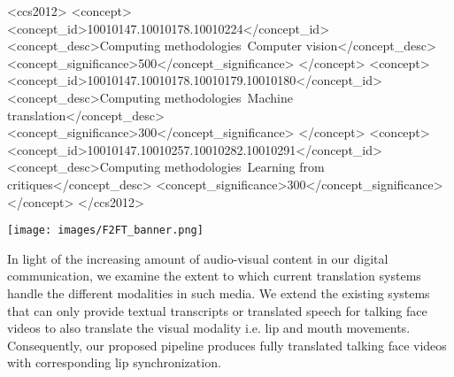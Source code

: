 \documentclass[sigconf]{acmart}
\begin{document}
\begin{CCSXML}
<ccs2012>
<concept>
<concept_id>10010147.10010178.10010224</concept_id>
<concept_desc>Computing methodologies~Computer vision</concept_desc>
<concept_significance>500</concept_significance>
</concept>
<concept>
<concept_id>10010147.10010178.10010179.10010180</concept_id>
<concept_desc>Computing methodologies~Machine translation</concept_desc>
<concept_significance>300</concept_significance>
</concept>
<concept>
<concept_id>10010147.10010257.10010282.10010291</concept_id>
<concept_desc>Computing methodologies~Learning from critiques</concept_desc>
<concept_significance>300</concept_significance>
</concept>
</ccs2012>
\end{CCSXML}



\begin{teaserfigure}
  \texttt{[image: images/F2FT\_banner.png]}
  \caption{In light of the increasing amount of audio-visual content in our digital communication, we examine the extent to which current translation systems handle the different modalities in such media. We extend the existing systems that can only provide textual transcripts or translated speech for talking face videos to also translate the visual modality i.e. lip and mouth movements. Consequently, our proposed pipeline produces fully translated talking face videos with corresponding lip synchronization.}
  \label{fig:teaser}
\end{teaserfigure}

\maketitle
\end{document}
